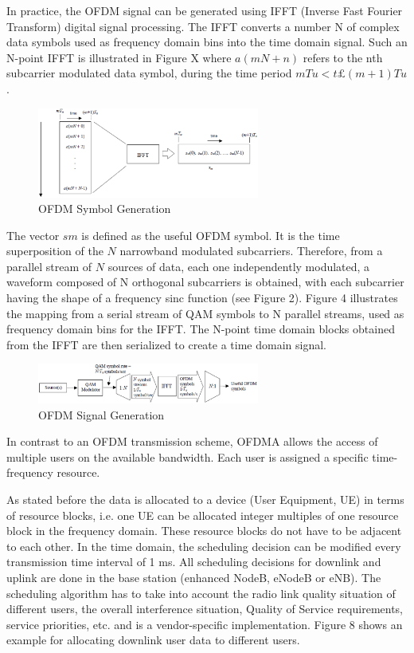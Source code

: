 In practice, the OFDM signal can be generated using IFFT (Inverse Fast Fourier Transform)
digital signal processing. The IFFT converts a number N of complex data
symbols used as frequency domain bins into the time domain signal. Such an N-point
IFFT is illustrated in Figure X where $a(mN+n)$ refers to the nth subcarrier
modulated data symbol, during the time period $mTu < t £ (m+1)Tu$.

\begin{figure}[htbp]
    \centering
    \includegraphics[width=0.65\textwidth]{./figures/ofdm_symbol_gen}
    \caption{ OFDM Symbol Generation
    \label{fig:ofdmsymbol}}
\end{figure}

The vector $sm$ is defined as the useful OFDM symbol. It is the time superposition
of the $N$ narrowband modulated subcarriers. Therefore, from a parallel stream
of $N$ sources of data, each one independently modulated, a waveform composed of
N orthogonal subcarriers is obtained, with each subcarrier having the shape of a
frequency sinc function (see Figure 2). Figure 4 illustrates the mapping from a
serial stream of QAM symbols to N parallel streams, used as frequency domain bins
for the IFFT. The N-point time domain blocks obtained from the IFFT are then
serialized to create a time domain signal.

\begin{figure}[htbp]
    \centering
    \includegraphics[width=0.65\textwidth]{./figures/ofdm_signal_chain}
    \caption{ OFDM Signal Generation
    \label{fig:ofdmchain}}
\end{figure}

In contrast to an OFDM transmission scheme, OFDMA allows the access of multiple
users on the available bandwidth. Each user is assigned a specific time-frequency
resource.

As stated before the data is allocated to a device (User Equipment, UE) in terms
of resource blocks, i.e. one UE can be allocated integer multiples of one resource
block in the frequency domain. These resource blocks do not have to be adjacent to
each other. In the time domain, the scheduling decision can be modified every
transmission time interval of 1 ms. All scheduling decisions for downlink and
uplink are done in the base station (enhanced NodeB, eNodeB or eNB). The scheduling
algorithm has to take into account the radio link quality situation of different
users, the overall interference situation, Quality of Service requirements, service
priorities, etc. and is a vendor-specific implementation. Figure 8 shows an example
for allocating downlink user data to different users.\\

